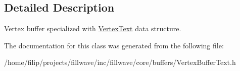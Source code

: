 \subsection{Detailed Description}
Vertex buffer specialized with \hyperlink{structflw_1_1flc_1_1VertexText}{Vertex\+Text} data structure. 

The documentation for this class was generated from the following file\+:\begin{DoxyCompactItemize}
\item 
/home/filip/projects/fillwave/inc/fillwave/core/buffers/Vertex\+Buffer\+Text.\+h\end{DoxyCompactItemize}
